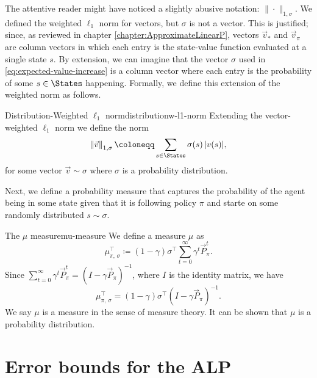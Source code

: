 The attentive reader might have noticed a slightly abusive notation: $\| \cdot
\|_{1, \sigma}$. We defined the weighted $\ell_1$ norm for vectors, but $\sigma$
is not a vector. This is justified; since, as reviewed in chapter
\ref{chapter:ApproximateLinearP}, vectors $\vec{v}_*$ and $\vec{v}_\pi$ are
column vectors in which each entry is the state-value function evaluated at a
single state $s$. By extension, we can imagine that the vector $\sigma$ used in
\eqref{eq:expected-value-increase} is a column vector where each entry is the
probability of some $s \in \States$ happening. Formally, we define this
extension of the weighted norm as follows.

\begin{dfn}{Distribution-Weighted $\ell_1$ norm}{distributionw-l1-norm}
    Extending the vector-weighted $\ell_1$ norm we define the norm
    \begin{equation*}
        \left\| \vec{v} \right\|_{1, \sigma} \coloneqq \sum_{s \in \States} \sigma(s) \, |v(s)|,
    \end{equation*}
    for some vector $\vec{v} \sim \sigma$ where $\sigma$ is a probability
    distribution.
\end{dfn}

Next, we define a probability measure that captures the probability of the agent
being in some state given that it is following policy $\pi$ and starte on some
randomly distributed $s \sim \sigma$.

\begin{dfn}{The $\mu$ measure}{mu-measure}
    We define a measure $\mu$ as
    \begin{equation*}
        \mu_{\pi, \, \sigma}^{\top} \coloneqq (1 - \gamma) \sigma^{\top} \sum_{t=0}^{\infty} \gamma^{t} \vec{P}_{\pi}^{t}.
    \end{equation*}
    Since $\sum_{t=0}^{\infty} \gamma^{t} \vec{P}_{\pi}^{t} = (I - \gamma
    \vec{P}_\pi)^{-1}$, where $I$ is the identity matrix, we have
    \begin{equation*}
        \mu_{\pi, \, \sigma}^{\top} = (1 - \gamma) \sigma^{\top} (I - \gamma \vec{P}_{\pi})^{-1}.
    \end{equation*}
    We say $\mu$ is a measure in the sense of measure theory. It can be shown
    \Cite[pg.~864]{farias2003LP2ADP} that $\mu$ is a probability distribution.
\end{dfn}

\section{Error bounds for the ALP}

